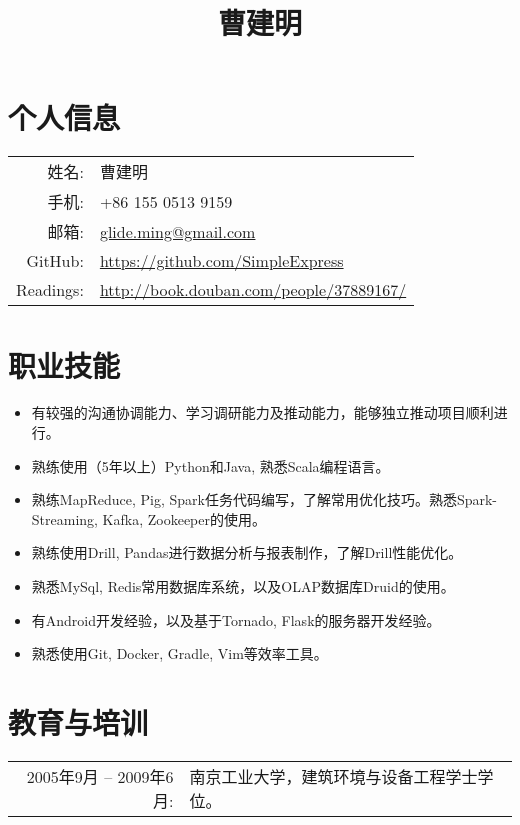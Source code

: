 \documentclass{ctexart}
\author{}
\title{\vspace{-1cm}曹建明}
\date{}
\begin{document}


\section*{个人信息}

\noindent\begin{tabular}{rl}
姓名: & 曹建明\\
手机: & +86 155 0513 9159\\
邮箱: & \href{mailto:glide.ming@gmail.com}{glide.ming@gmail.com}\\
{\sc GitHub:} & \href{https://github.com/SimpleExpress}{https://github.com/SimpleExpress}\\
{\sc Readings:} & \href{http://book.douban.com/people/37889167/}{http://book.douban.com/people/37889167/}

\end{tabular}

\section*{职业技能}

\begin{itemize}
\item 有较强的沟通协调能力、学习调研能力及推动能力，能够独立推动项目顺利进行。
\item 熟练使用（5年以上）Python和Java, 熟悉Scala编程语言。
\item 熟练MapReduce, Pig, Spark任务代码编写，了解常用优化技巧。熟悉Spark-Streaming, Kafka, Zookeeper的使用。
\item 熟练使用Drill, Pandas进行数据分析与报表制作，了解Drill性能优化。
\item 熟悉MySql, Redis常用数据库系统，以及OLAP数据库Druid的使用。
\item 有Android开发经验，以及基于Tornado, Flask的服务器开发经验。
\item 熟悉使用Git, Docker, Gradle, Vim等效率工具。
\end{itemize}

\section*{教育与培训}

\noindent\begin{tabular}{rl}
2005年9月 -- 2009年6月: & 南京工业大学，建筑环境与设备工程学士学位。
\end{tabular}
\end{document}
